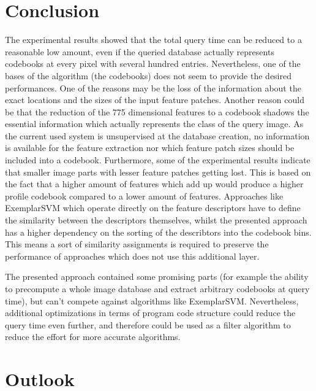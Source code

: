 \chapter{Conclusion}

The experimental results showed that the total query time can be reduced to a reasonable low amount, even if the queried database actually represents codebooks at every pixel with several hundred entries. Nevertheless, one of the bases of the algorithm (the codebooks) does not seem to provide the desired performances. One of the reasons may be the loss of the information about the exact locations and the sizes of the input feature patches. Another reason could be that the reduction of the 775 dimensional features to a codebook shadows the essential information which actually represents the class of the query image. As the current used system is unsupervised at the database creation, no information is available for the feature extraction nor which feature patch sizes should be included into a codebook. Furthermore, some of the experimental results indicate that smaller image parts with lesser feature patches getting lost. This is based on the fact that a higher amount of features which add up would produce a higher profile codebook compared to a lower amount of features. Approaches like ExemplarSVM which operate directly on the feature descriptors have to define the similarity between the descriptors themselves, whilst the presented approach has a higher dependency on the sorting of the describtors into the codebook bins. This means a sort of similarity assignments is required to preserve the performance of approaches which does not use this additional layer.

The presented approach contained some promising parts (for example the ability to precompute a whole image database and extract arbitrary codebooks at query time), but can't compete against algorithms like ExemplarSVM. Nevertheless, additional optimizations in terms of program code structure could reduce the query time even further, and therefore could be used as a filter algorithm to reduce the effort for more accurate algorithms.

\chapter{Outlook}